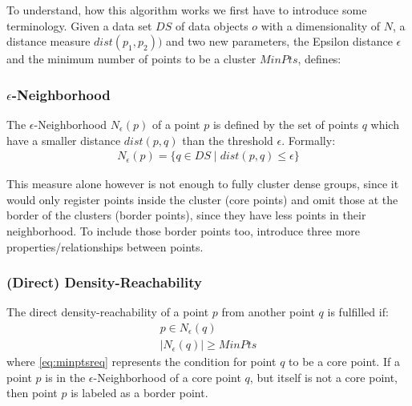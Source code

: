 To understand, how this algorithm works we first have to introduce some terminology.
Given a data set $DS$ of data objects $o$ with a dimensionality of $N$, a distance measure $dist(p_1,p_2))$ and two new parameters, the Epsilon distance $\epsilon$ and the minimum number of points to be a cluster $MinPts$, \citeauthor{DBSCANEKSX96} defines:

\subsubsection*{$\epsilon$-Neighborhood}
The $\epsilon$-Neighborhood $N_{\epsilon}(p)$ of a point $p$ is defined by the set of points $q$ which have a smaller distance $dist(p,q)$ than the threshold $\epsilon$. Formally: 
\begin{align}
    N_{\epsilon}(p)=\{q \in DS \mid dist(p,q) \leq \epsilon\}
\end{align}

This measure alone however is not enough to fully cluster dense groups, since it would only register points inside the cluster (core points) and omit those at the border of the clusters (border points), since they have less points in their neighborhood. To include those border points too, \citeauthor{DBSCANEKSX96} introduce three more properties/relationships between points.

\subsubsection*{(Direct) Density-Reachability}
The direct density-reachability of a point $p$ from another point $q$ is fulfilled if:
\begin{align}
    p \in N_{\epsilon}(q)\label{eq:pinN}\\
    |N_{\epsilon}(q)|\geq MinPts\label{eq:minptsreq}
\end{align}
where \autoref{eq:minptsreq} represents the condition for point \(q\) to be a core point. If a point \(p\) is in the $\epsilon$-Neighborhood of a core point $q$, but itself is not a core point, then point $p$ is labeled as a border point. 

